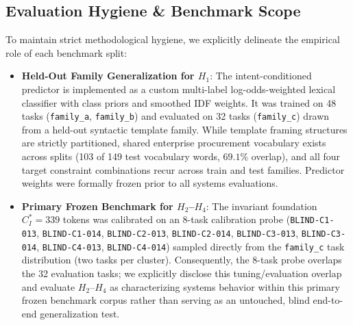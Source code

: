 \subsection{Evaluation Hygiene \texorpdfstring{\&}{and} Benchmark Scope}
To maintain strict methodological hygiene, we explicitly delineate the empirical role of each benchmark split:
\begin{itemize}
    \item \textbf{Held-Out Family Generalization for $H_1$}: The intent-conditioned predictor is implemented as a custom multi-label log-odds-weighted lexical classifier with class priors and smoothed IDF weights. It was trained on 48 tasks (\texttt{family\_a}, \texttt{family\_b}) and evaluated on 32 tasks (\texttt{family\_c}) drawn from a held-out syntactic template family. While template framing structures are strictly partitioned, shared enterprise procurement vocabulary exists across splits (103 of 149 test vocabulary words, $69.1\%$ overlap), and all four target constraint combinations recur across train and test families. Predictor weights were formally frozen prior to all systems evaluations.
    \item \textbf{Primary Frozen Benchmark for $H_2$--$H_4$}: The invariant foundation $C_I^* = 339$ tokens was calibrated on an 8-task calibration probe (\texttt{BLIND-C1-013}, \texttt{BLIND-C1-014}, \texttt{BLIND-C2-013}, \texttt{BLIND-C2-014}, \texttt{BLIND-C3-013}, \texttt{BLIND-C3-014}, \texttt{BLIND-C4-013}, \texttt{BLIND-C4-014}) sampled directly from the \texttt{family\_c} task distribution (two tasks per cluster). Consequently, the 8-task probe overlaps the 32 evaluation tasks; we explicitly disclose this tuning/evaluation overlap and evaluate $H_2$--$H_4$ as characterizing systems behavior within this primary frozen benchmark corpus rather than serving as an untouched, blind end-to-end generalization test.
\end{itemize}

